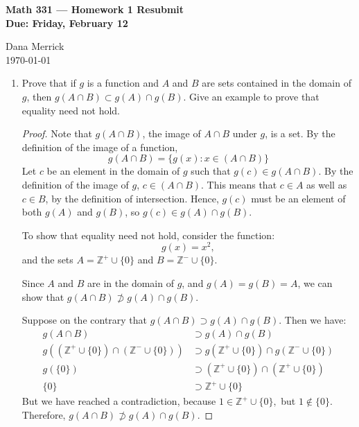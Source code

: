 \documentclass[12pt]{amsart}
\begin{document}
\thispagestyle{empty}

\begin{center}
{\bf Math 331  --- Homework 1 Resubmit \\
Due:  Friday, February 12}
\end{center}

\bigskip

\noindent
Dana Merrick \\
\today

\bigskip

\begin{enumerate}
\renewcommand{\itemsep}{6pt}

\addtocounter{enumi}{1}

\item Prove that if $g$ is a function and $A$ and $B$ are sets
  contained in the domain of $g$, then $g(A\cap B)\subset g(A)\cap
  g(B)$. Give an example to prove that equality need not hold.
  
\begin{proof}
Note that $g(A\cap B)$, the image of $A\cap B$ under $g$, is a set. By the definition of the image of a function,
\[ g(A\cap B) = \{ g(x) : x \in (A\cap B) \} \]
Let $c$ be an element in the domain of $g$ such that $g(c)\in g(A\cap B)$. By the definition of the image of $g$, $c\in (A\cap B)$. This means that $c\in A$ as well as $c\in B$, by the definition of intersection. Hence, $g(c)$ must be an element of both $g(A)$ and $g(B)$, so $g(c)\in g(A)\cap g(B)$.

To show that equality need not hold, consider the function:
\[ g(x) = x^2, \]
and the sets $A=\mathbb Z^+\cup \{0\}$ and $B=\mathbb Z^-\cup \{0\}$.

Since $A$ and $B$ are in the domain of $g$, and $g(A) = g(B) = A$, we can show that $g(A\cap B)\not\supset g(A)\cap g(B)$.

Suppose on the contrary that $g(A\cap B)\supset g(A)\cap g(B)$. Then we have:
\begin{align*}
 g(A\cap B)&\supset g(A)\cap g(B) \\
 g\left((\mathbb Z^+\cup \{0\}) \cap (\mathbb Z^-\cup \{0\})\right) &\supset g(\mathbb Z^+\cup \{0\}) \cap g(\mathbb Z^-\cup \{0\}) \\
  g(\{0\}) &\supset (\mathbb Z^+\cup \{0\}) \cap (\mathbb Z^+\cup \{0\}) \\
  \{0\} &\supset \mathbb Z^+\cup\{0\}
 \end{align*}
But we have reached a contradiction, because $1\in\mathbb Z^+\cup\{0\},$ but $1\not\in\{0\}.$ Therefore, $g(A\cap B)\not\supset g(A)\cap g(B)$.
\end{proof}


\end{enumerate}
\end{document}
